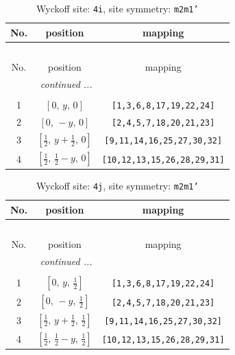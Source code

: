 \documentclass[fleqn,8pt]{jsarticle}
\begin{document}
\renewcommand{\arraystretch}{1.2}
\begin{longtable}{ccc}
\caption{Wyckoff site: {\tt 4i}, site symmetry: {\tt m2m1'}}
 \\
 \hline \hline
No. & position & mapping \\ \hline \endfirsthead

\multicolumn{2}{l}{\tablename\ \thetable{}} \\
 \hline \hline
No. & position & mapping \\ \hline \endhead

 \hline \hline
\multicolumn{2}{r}{\footnotesize\it continued ...} \\ \endfoot

 \hline \hline
\multicolumn{2}{r}{} \\ \endlastfoot

1 & $\left[ 0,\, y,\, 0 \right]$ & {\tt [1,3,6,8,17,19,22,24]} \\ \hline
2 & $\left[ 0,\, - y,\, 0 \right]$ & {\tt [2,4,5,7,18,20,21,23]} \\ \hline
3 & $\left[ \frac{1}{2},\, y + \frac{1}{2},\, 0 \right]$ & {\tt [9,11,14,16,25,27,30,32]} \\ \hline
4 & $\left[ \frac{1}{2},\, \frac{1}{2} - y,\, 0 \right]$ & {\tt [10,12,13,15,26,28,29,31]} \\
\end{longtable}
\renewcommand{\arraystretch}{1.2}
\begin{longtable}{ccc}
\caption{Wyckoff site: {\tt 4j}, site symmetry: {\tt m2m1'}}
 \\
 \hline \hline
No. & position & mapping \\ \hline \endfirsthead

\multicolumn{2}{l}{\tablename\ \thetable{}} \\
 \hline \hline
No. & position & mapping \\ \hline \endhead

 \hline \hline
\multicolumn{2}{r}{\footnotesize\it continued ...} \\ \endfoot

 \hline \hline
\multicolumn{2}{r}{} \\ \endlastfoot

1 & $\left[ 0,\, y,\, \frac{1}{2} \right]$ & {\tt [1,3,6,8,17,19,22,24]} \\ \hline
2 & $\left[ 0,\, - y,\, \frac{1}{2} \right]$ & {\tt [2,4,5,7,18,20,21,23]} \\ \hline
3 & $\left[ \frac{1}{2},\, y + \frac{1}{2},\, \frac{1}{2} \right]$ & {\tt [9,11,14,16,25,27,30,32]} \\ \hline
4 & $\left[ \frac{1}{2},\, \frac{1}{2} - y,\, \frac{1}{2} \right]$ & {\tt [10,12,13,15,26,28,29,31]} \\
\end{longtable}
\end{document}
